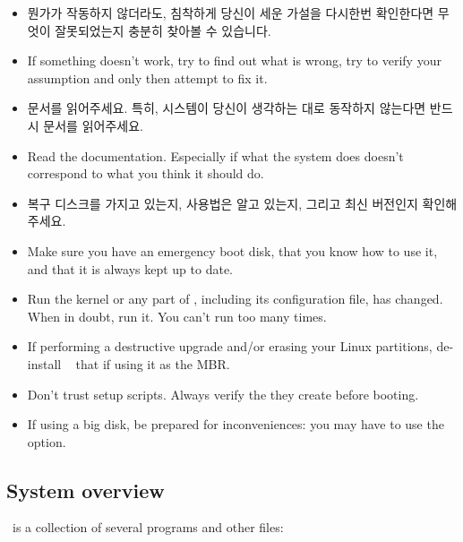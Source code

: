 \begin{itemize}
  \item {} 뭔가가 작동하지 않더라도,
  침착하게 당신이 세운 가설을 다시한번 확인한다면 무엇이 잘못되었는지 충분히 찾아볼 수 있습니다.
  \item {} If something doesn't work, try to find
    out what is wrong, try to verify your assumption and only then attempt
    to fix it.
  \item 문서를 읽어주세요. 특히, 시스템이 당신이 생각하는 대로 동작하지 않는다면 반드시 문서를 읽어주세요.    
  \item Read the documentation. Especially if what the system does doesn't
    correspond to what you think it should do.
  \item 복구 디스크를 가지고 있는지, 사용법은 알고 있는지, 그리고 최신 버전인지 확인해 주세요.
  \item Make sure you have an emergency boot disk, that you know how to
    use it, and that it is always kept up to date.
  \item Run   the kernel or any part
    of \LILO, including its configuration file, has changed. When in doubt,
    run it. You can't run  too many times.
  \item If performing a destructive upgrade and/or erasing your Linux
    partitions, de-install \LILO\  that if using it as the
    MBR.
  \item Don't trust setup scripts. Always verify the 
    they create before booting.
  \item If using a big disk, be prepared for inconveniences: you may have
    to use the  option.
\end{itemize}


\newpage
\subsection*{System overview}

\LILO\ is a collection of several programs and other files:

